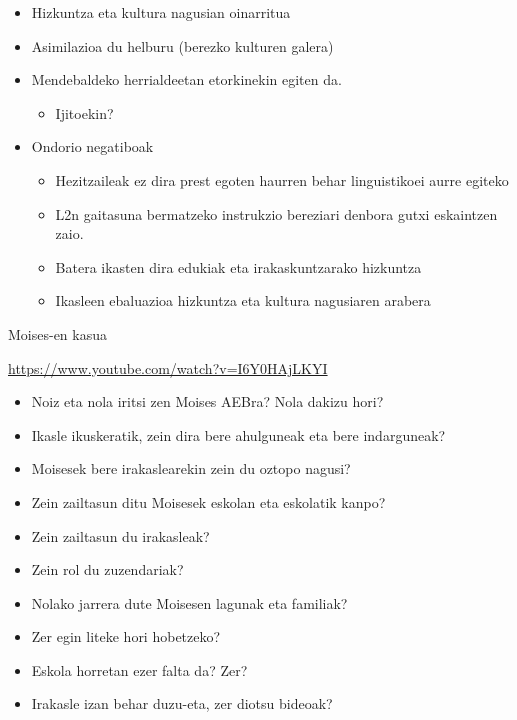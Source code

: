 \documentclass[
]{book}
\providecommand{\tightlist}{%
  \setlength{\itemsep}{0pt}\setlength{\parskip}{0pt}}
\begin{document}
\begin{itemize}
\tightlist
\item
  Hizkuntza eta kultura nagusian oinarritua
\item
  Asimilazioa du helburu (berezko kulturen galera)
\item
  Mendebaldeko herrialdeetan etorkinekin egiten da.

  \begin{itemize}
  \tightlist
  \item
    Ijitoekin?
  \end{itemize}
\item
  Ondorio negatiboak

  \begin{itemize}
  \tightlist
  \item
    Hezitzaileak ez dira prest egoten haurren behar linguistikoei aurre egiteko
  \item
    L2n gaitasuna bermatzeko instrukzio bereziari denbora gutxi eskaintzen zaio.
  \item
    Batera ikasten dira edukiak eta irakaskuntzarako hizkuntza
  \item
    Ikasleen ebaluazioa hizkuntza eta kultura nagusiaren arabera
  \end{itemize}
\end{itemize}

Moises-en kasua

\url{https://www.youtube.com/watch?v=I6Y0HAjLKYI}

\begin{itemize}
\tightlist
\item
  Noiz eta nola iritsi zen Moises AEBra? Nola dakizu hori?
\item
  Ikasle ikuskeratik, zein dira bere ahulguneak eta bere indarguneak?
\item
  Moisesek bere irakaslearekin zein du oztopo nagusi?
\item
  Zein zailtasun ditu Moisesek eskolan eta eskolatik kanpo?
\item
  Zein zailtasun du irakasleak?
\item
  Zein rol du zuzendariak?
\item
  Nolako jarrera dute Moisesen lagunak eta familiak?
\item
  Zer egin liteke hori hobetzeko?
\item
  Eskola horretan ezer falta da? Zer?
\item
  Irakasle izan behar duzu-eta, zer diotsu bideoak?
\end{itemize}
\end{document}
